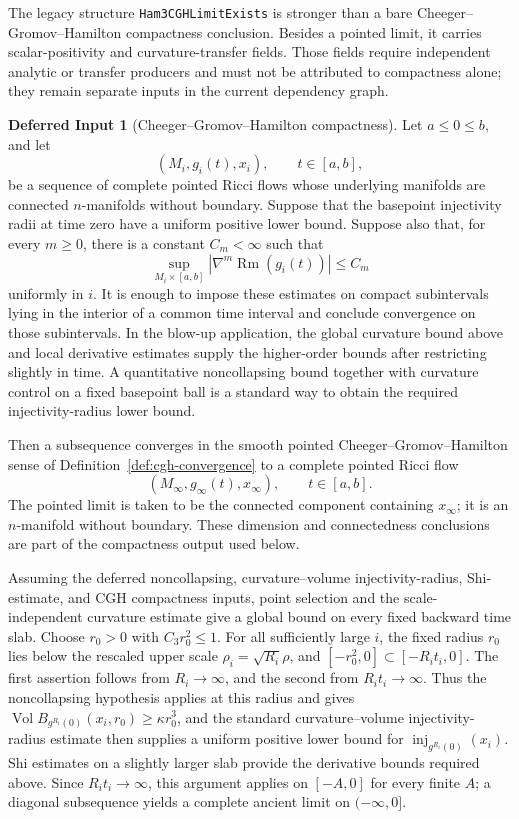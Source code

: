 \documentclass[11pt]{article}
\theoremstyle{plain}
\theoremstyle{definition}
\newtheorem{deferred}[theorem]{Deferred Input}
\theoremstyle{remark}
\newcommand{\Rm}{\operatorname{Rm}}
\newcommand{\Vol}{\operatorname{Vol}}
\newcommand{\norm}[1]{\left|#1\right|}
\newcommand{\leanref}[1]{\nolinkurl{#1}}
\begin{document}
The legacy structure \leanref{Ham3CGHLimitExists} is stronger than a bare
Cheeger--Gromov--Hamilton compactness conclusion.  Besides a pointed limit, it
carries scalar-positivity and curvature-transfer fields.  Those fields require
independent analytic or transfer producers and must not be attributed to
compactness alone; they remain separate inputs in the current dependency
graph.

\begin{deferred}[Cheeger--Gromov--Hamilton compactness]
\label{bb:cgh-compactness}
Let $a\le0\le b$, and let
\[
(M_i,g_i(t),x_i),
\qquad
 t\in[a,b],
\]
be a sequence of complete pointed Ricci flows whose underlying manifolds are
connected $n$-manifolds without boundary.  Suppose that the basepoint
injectivity radii at time zero have a uniform positive lower bound.  Suppose
also that, for every $m\ge0$, there is a constant $C_m<\infty$ such that
\[
\sup_{M_i\times[a,b]}\norm{\nabla^m\Rm(g_i(t))}\le C_m
\]
uniformly in $i$.  It is enough to impose these estimates on compact
subintervals lying in the interior of a common time interval and conclude
convergence on those subintervals.  In the blow-up application, the global
curvature bound above and local derivative estimates supply the higher-order
bounds after restricting slightly in time.  A quantitative noncollapsing bound
together with curvature control on a fixed basepoint ball is a standard way to
obtain the required injectivity-radius lower bound.

Then a subsequence converges in the smooth pointed Cheeger--Gromov--Hamilton
sense of Definition~\ref{def:cgh-convergence} to a complete pointed Ricci flow
\[
(M_\infty,g_\infty(t),x_\infty),
\qquad
 t\in[a,b].
\]
The pointed limit is taken to be the connected component containing
$x_\infty$; it is an $n$-manifold without boundary.  These dimension and
connectedness conclusions are part of the compactness output used below.
\end{deferred}

Assuming the deferred noncollapsing, curvature--volume injectivity-radius,
Shi-estimate, and CGH compactness inputs, point selection and the
scale-independent curvature estimate give a global bound on every fixed
backward time slab.
Choose $r_0>0$ with $C_3r_0^2\le1$.  For all sufficiently large \(i\), the
fixed radius \(r_0\) lies below the rescaled upper scale
\(\rho_i=\sqrt{R_i}\rho\), and
\([-r_0^2,0]\subset[-R_it_i,0]\).  The first assertion follows from
\(R_i\to\infty\), and the second from \(R_it_i\to\infty\).  Thus the
noncollapsing hypothesis applies at this radius and gives
$\Vol B_{g^{R_i}(0)}(x_i,r_0)\ge\kappa r_0^3$, and the standard
curvature--volume injectivity-radius estimate then supplies a uniform positive
lower bound for $\operatorname{inj}_{g^{R_i}(0)}(x_i)$.  Shi estimates on a
slightly larger slab provide the derivative bounds required above.  Since
$R_it_i\to\infty$, this argument applies on $[-A,0]$ for every finite $A$;
a diagonal subsequence yields a complete ancient limit on $(-\infty,0]$.
\end{document}

